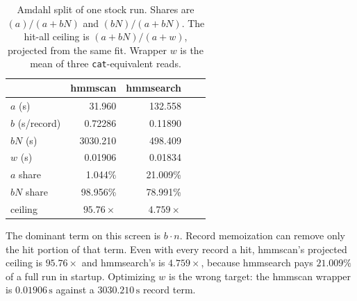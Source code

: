 \documentclass[letterpaper,twocolumn,10pt]{article}
\begin{document}
\begin{table}[t]
\caption{Amdahl split of one stock run.
Shares are $(a)/(a+bN)$ and $(bN)/(a+bN)$.
The hit-all ceiling is $(a+bN)/(a+w)$, projected from the same fit.
Wrapper $w$ is the mean of three \texttt{cat}-equivalent reads.}
\label{tab:amdahl}
\small
\begin{tabular}{@{}lrrrr@{}}
\toprule
& hmmscan & hmmsearch \\
\midrule
$a$ (s) & 31.960 & 132.558 \\
$b$ (s/record) & 0.72286 & 0.11890 \\
$bN$ (s) & 3030.210 & 498.409 \\
$w$ (s) & 0.01906 & 0.01834 \\
$a$ share & 1.044\% & 21.009\% \\
$bN$ share & 98.956\% & 78.991\% \\
ceiling & $95.76\times$ & $4.759\times$ \\
\bottomrule
\end{tabular}
\end{table}

The dominant term on this screen is $b \cdot n$.
Record memoization can remove only the hit portion of that term.
Even with every record a hit, hmmscan's projected ceiling is
$95.76\times$
and hmmsearch's is
$4.759\times$,
because hmmsearch pays
$21.009\%$
of a full run in startup.
Optimizing $w$ is the wrong target: the hmmscan wrapper is
$0.01906\,\mathrm{s}$
against a
$3030.210\,\mathrm{s}$
record term.
\end{document}
